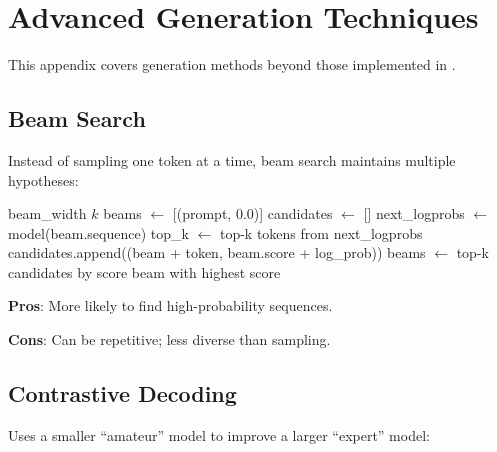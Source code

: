 \chapter{Advanced Generation Techniques}
\label{app:advanced-generation}

This appendix covers generation methods beyond those implemented in \TryLM.

\section{Beam Search}

Instead of sampling one token at a time, beam search maintains multiple hypotheses:

\begin{algorithm}[H]
\caption{Beam Search}
\begin{algorithmic}[1]
\Require beam\_width $k$
\State beams $\gets$ [(prompt, 0.0)]  
    \State candidates $\gets$ []
        \State next\_logprobs $\gets$ model(beam.sequence)
        \State top\_k $\gets$ top-k tokens from next\_logprobs
            \State candidates.append((beam + token, beam.score + log\_prob))
        \EndFor
    \EndFor
    \State beams $\gets$ top-k candidates by score
\EndFor
\State \Return beam with highest score
\end{algorithmic}
\end{algorithm}

\textbf{Pros}: More likely to find high-probability sequences.

\textbf{Cons}: Can be repetitive; less diverse than sampling.

\section{Contrastive Decoding}

Uses a smaller ``amateur'' model to improve a larger ``expert'' model:

